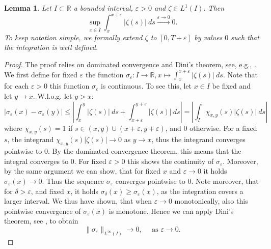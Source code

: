 \documentclass{m2an}
\newtheorem{lemma}[theorem]{Lemma}
\begin{document}
\begin{lemma}\label{lemm:vanishing_support}
  Let $I \subset \mathbb R$ a bounded interval, $\varepsilon > 0$ and $\zeta \in L^1(I)$.
  Then 
  \begin{equation*}
    \sup_{x \in \bar I} \int_x^{x+\varepsilon} |\zeta(s)| \ ds \xrightarrow{\varepsilon \to 0} 0.
  \end{equation*}
  To keep notation simple, we formally extend $\zeta$ to $[0,T+ \varepsilon]$ by values $0$ such that
  the integration is well defined.
\end{lemma}
\begin{proof}
  The proof relies on dominated convergence and Dini's theorem, see, e.g., \cite[p. 125]{Brokate2015}.
  We first define for fixed $\varepsilon$ the function 
  $\sigma_\varepsilon: \bar I \to \mathbb R, x \mapsto \int_x^{x+\varepsilon} |\zeta(s)| \ ds$.
  Note that for each $\varepsilon > 0$ this function $\sigma_\varepsilon$ is continuous. To see this,
  let $x \in I$ be fixed and let $y \to x$. W.l.o.g. let $y>x$:
  \begin{equation*}
  |\sigma_\varepsilon(x) - \sigma_\varepsilon(y)| 
  \le \left|\int_x^{y} |\zeta(s)| \ ds + \int_{x+\varepsilon}^{y+\varepsilon} |\zeta(s)| \ ds \right|
  = \left| \int_{I} \chi_{x,y}(s)|\zeta(s)| \ ds \right|
  \end{equation*}
  where $\chi_{x,y}(s) = 1$ if $s \in (x,y) \cup (x+\varepsilon, y + \varepsilon)$, and $0$ otherwise.
  For a fixed $s$, the integrand $\chi_{x,y}(s)|\zeta(s)| \to 0$ as $y \to x$, thus the integrand
  converges pointwise to $0$. By the dominated convergence theorem, this means that the integral converges to
  $0$. For fixed $\varepsilon> 0$ this shows the continuity of $\sigma_\varepsilon$.
  Moreover, by the same argument we can show, that for fixed $x$ and $\varepsilon \to 0$ it holds
  $\sigma_\varepsilon(x) \to 0$. Thus the sequence $\sigma_\varepsilon$ converges pointwise to $0$.
  Note moreover, that for $\delta > \varepsilon$, and fixed $x$, it holds $\sigma_\delta(x) \ge \sigma_\varepsilon(x)$,
  as the integration covers a larger interval. We thus have shown, that when 
  $\varepsilon \to 0$ monotonically, also this pointwise convergence of $\sigma_\varepsilon(x)$ is monotone.
  Hence we can apply Dini's theorem, see \cite[p. 125]{Brokate2015}, to obtain
  \begin{equation*}
    \|\sigma_\varepsilon\|_{L^\infty(I)} \rightarrow 0, \quad \text{ as } \varepsilon \rightarrow 0.
  \end{equation*}
\end{proof}
\end{document}

